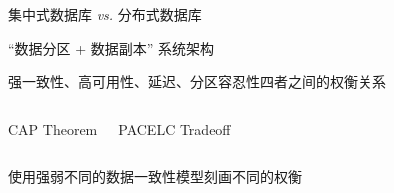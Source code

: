 
\begin{frame}{}
	\begin{center}
		集中式数据库 \emph{vs.} 分布式数据库


	\end{center}
\end{frame}

\begin{frame}{}
	\begin{center}
		``数据分区 + 数据副本'' 系统架构
	\end{center}
\end{frame}

\begin{frame}{}
	\begin{center}
		强一致性、高可用性、延迟、分区容忍性四者之间的权衡关系
	\end{center}
	\begin{columns}[c]
		\begin{center}
			{CAP Theorem}%
		\end{center}
		\begin{center}

			\vspace{0.50cm}
			{PACELC Tradeoff\\ }
		\end{center}
	\end{columns}
\end{frame}

\begin{frame}{}
	\begin{center}
		使用强弱不同的数据一致性模型刻画不同的权衡
	\end{center}

	\begin{columns}[c]
	\end{columns}
\end{frame}

